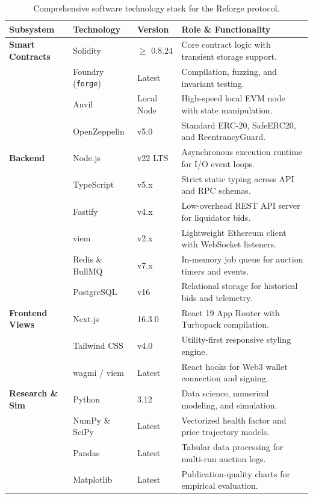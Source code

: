 \begin{table}[htbp]
\centering
\small
\renewcommand{\arraystretch}{0.85}
\caption{Comprehensive software technology stack for the Reforge protocol.}
\label{tab:software_requirements}
\begin{tabular}{p{2.6cm}|p{2.6cm}|p{1.8cm}|p{6.6cm}}
\hline
\textbf{Subsystem} & \textbf{Technology} & \textbf{Version} & \textbf{Role \& Functionality} \\
\hline
\textbf{Smart Contracts} & Solidity & $\ge$ 0.8.24 & Core contract logic with transient storage support. \\
& Foundry (\texttt{forge}) & Latest & Compilation, fuzzing, and invariant testing. \\
& Anvil & Local Node & High-speed local EVM node with state manipulation. \\
& OpenZeppelin & v5.0 & Standard ERC-20, SafeERC20, and ReentrancyGuard. \\
\hline
\textbf{Backend} & Node.js & v22 LTS & Asynchronous execution runtime for I/O event loops. \\
& TypeScript & v5.x & Strict static typing across API and RPC schemas. \\
& Fastify & v4.x & Low-overhead REST API server for liquidator bids. \\
& viem & v2.x & Lightweight Ethereum client with WebSocket listeners. \\
& Redis \& BullMQ & v7.x & In-memory job queue for auction timers and events. \\
& PostgreSQL & v16 & Relational storage for historical bids and telemetry. \\
\hline
\textbf{Frontend Views} & Next.js & 16.3.0 & React 19 App Router with Turbopack compilation. \\
& Tailwind CSS & v4.0 & Utility-first responsive styling engine. \\
& wagmi / viem & Latest & React hooks for Web3 wallet connection and signing. \\
\hline
\textbf{Research \& Sim} & Python & 3.12 & Data science, numerical modeling, and simulation. \\
& NumPy \& SciPy & Latest & Vectorized health factor and price trajectory models. \\
& Pandas & Latest & Tabular data processing for multi-run auction logs. \\
& Matplotlib & Latest & Publication-quality charts for empirical evaluation. \\
\hline
\end{tabular}
\end{table}

